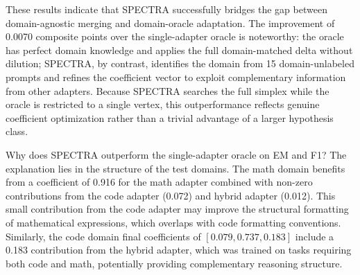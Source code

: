 \documentclass[preprint,12pt]{elsarticle}
\begin{document}
\begin{table}[t]
\centering
\caption{Main Comparison Results on the Held-Out Test Sets (50 Examples Per Domain, 5 Seeds). Composite $= 0.40 \times \text{EM} + 0.35 \times \text{F1} + 0.25 \times \text{RL}$. Best result per column in bold. SPECTRA results include 95\% bootstrap confidence intervals.}
\label{tab:main}
\end{table}

These results indicate that SPECTRA successfully bridges the gap between
domain-agnostic merging and domain-oracle adaptation. The improvement of 0.0070
composite points over the single-adapter oracle is noteworthy: the oracle has
perfect domain knowledge and applies the full domain-matched delta without
dilution; SPECTRA, by contrast, identifies the domain from 15 domain-unlabeled
prompts and refines the coefficient vector to exploit complementary information
from other adapters. Because SPECTRA searches the full simplex while the oracle
is restricted to a single vertex, this outperformance reflects genuine
coefficient optimization rather than a trivial advantage of a larger hypothesis
class.

Why does SPECTRA outperform the single-adapter oracle on EM and F1? The
explanation lies in the structure of the test domains. The math domain benefits
from a coefficient of 0.916 for the math adapter combined with non-zero
contributions from the code adapter (0.072) and hybrid adapter (0.012).
This small contribution from the code adapter may improve the structural
formatting of mathematical expressions, which overlaps with code formatting
conventions. Similarly, the code domain final coefficients of
$[0.079, 0.737, 0.183]$ include a 0.183 contribution from the hybrid adapter,
which was trained on tasks requiring both code and math, potentially providing
complementary reasoning structure.
\end{document}
